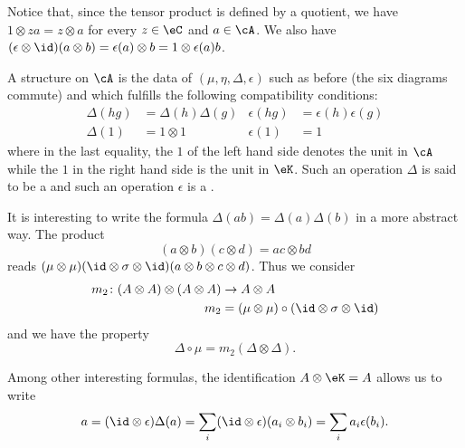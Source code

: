 Notice that, since the tensor product is defined by a quotient, we have $1\otimes za=z\otimes a$ for every $z\in\eC$ and $a\in\cA$. We also have $(\epsilon\otimes\id)(a\otimes b)=\epsilon(a)\otimes b=1\otimes\epsilon(a)b$.

\begin{definition}      \label{DefBialgebra}
	A  structure on $\cA$ is the data of $(\mu,\eta,\Delta,\epsilon)$ such as before (the six diagrams commute) and which fulfills the following compatibility conditions:
	\begin{align}       \label{EqSixBialgebraformdef}
		\Delta(hg) & =\Delta(h)\Delta(g) & \epsilon(hg) & =\epsilon(h)\epsilon(g) \\
		\Delta(1)  & =1\otimes 1         & \epsilon(1)  & =1
	\end{align}
	where in the last equality, the $1$ of the left hand side denotes the unit in $\cA$ while the $1$ in the right hand side is the unit in $\eK$. Such an operation $\Delta$ is said to be a  and such an operation $\epsilon$ is a .
\end{definition}

It is interesting to write the formula \( \Delta(ab)=\Delta(a)\Delta(b)\) in a more abstract way. The product
\begin{equation}
	(a\otimes b)(c\otimes d)=ac\otimes bd
\end{equation}
reads $(\mu\otimes\mu)(\id\otimes\sigma\otimes\id)(a\otimes b\otimes c\otimes d)$. Thus we consider
\begin{equation}        \label{EqDefmdeuxAAotAAmtAA}
	\begin{aligned}
		m_2\colon (A\otimes A)\otimes (A\otimes A) & \to A\otimes A                                    \\
		m_2                                        & =(\mu\otimes\mu)\circ(\id\otimes\sigma\otimes\id)
	\end{aligned}
\end{equation}
and we have the property
\begin{equation}        \label{EqDelMumdex}
	\Delta\circ\mu=m_2(\Delta\otimes\Delta).
\end{equation}


Among other interesting formulas, the identification \( A\otimes \eK=A\) allows us to write
\begin{equation}    \label{EqInterAmongOtheaaepsb}
	a=(\id\otimes\epsilon)\Delta(a)=\sum_i(\id\otimes \epsilon)(a_i\otimes b_i)=\sum_ia_i\epsilon(b_i).
\end{equation}

